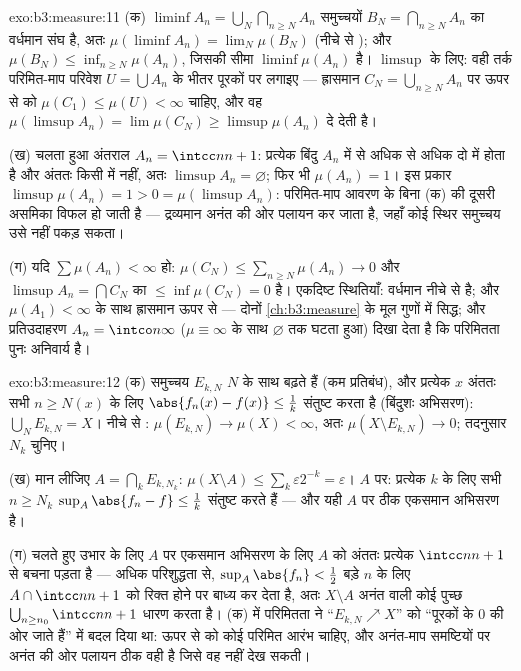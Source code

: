 \begin{solution}{exo:b3:measure:11}
(क) $\liminf A_n = \bigcup_N\bigcap_{n\geq N}A_n$ समुच्चयों $B_N = \bigcap_{n\geq N}A_n$ का वर्धमान संघ है, अतः $\mu(\liminf A_n) = \lim_N\mu(B_N)$ (नीचे से
); और $\mu(B_N) \leq \inf_{n \geq N}\mu(A_n)$, जिसकी सीमा $\liminf\mu(A_n)$ है। $\limsup$ के लिए: वही तर्क
परिमित-माप परिवेश $U = \bigcup A_n$ के भीतर पूरकों पर लगाइए --- ह्रासमान $C_N = \bigcup_{n\geq N}A_n$
पर ऊपर से  को $\mu(C_1)
\leq \mu(U) < \infty$ चाहिए, और वह $\mu(\limsup A_n) =
\lim\mu(C_N) \geq \limsup\mu(A_n)$ दे देती है।

(ख) चलता हुआ अंतराल $A_n = \intcc n{n+1}$: प्रत्येक बिंदु $A_n$ में से अधिक से अधिक
दो में होता है और अंततः किसी में नहीं, अतः $\limsup A_n = \varnothing$; फिर भी $\mu(A_n) = 1$।
इस प्रकार $\limsup\mu(A_n) = 1 > 0 = \mu(\limsup A_n)$: परिमित-माप आवरण के बिना (क) की दूसरी असमिका विफल
हो जाती है --- द्रव्यमान अनंत की ओर पलायन कर जाता है, जहाँ कोई स्थिर
समुच्चय उसे नहीं पकड़ सकता।

(ग) यदि $\sum\mu(A_n) < \infty$ हो: $\mu(C_N) \leq
\sum_{n\geq N}\mu(A_n) \to 0$ और $\limsup A_n =
\bigcap C_N$ का  $\leq \inf\mu(C_N) = 0$ है। एकदिष्ट स्थितियाँ:
वर्धमान नीचे से  है; और $\mu(A_1) < \infty$ के साथ ह्रासमान ऊपर से 
--- दोनों \cref{ch:b3:measure} के मूल गुणों में सिद्ध; और प्रतिउदाहरण $A_n = \intco n\infty$ ($\mu \equiv \infty$
के साथ $\varnothing$ तक घटता हुआ) दिखा देता है कि परिमितता पुनः अनिवार्य
है।
\end{solution}

\begin{solution}{exo:b3:measure:12}
(क) समुच्चय $E_{k,N}$ $N$ के साथ बढ़ते हैं (कम प्रतिबंध), और प्रत्येक
$x$ अंततः सभी $n \geq N(x)$ के लिए $\abs{f_n(x)
- f(x)} \leq \frac1k$ संतुष्ट करता है (बिंदुशः अभिसरण):
$\bigcup_NE_{k,N} = X$। नीचे से : $\mu(E_{k,N}) \to \mu(X) < \infty$, अतः $\mu(X\setminus
E_{k,N}) \to 0$; तदनुसार $N_k$ चुनिए।

(ख) मान लीजिए $A = \bigcap_kE_{k,N_k}$: $\mu(X\setminus A) \leq
\sum_k\varepsilon2^{-k} = \varepsilon$। $A$ पर: प्रत्येक $k$ के लिए सभी
$n \geq N_k$ $\sup_A\abs{f_n - f} \leq
\frac1k$ संतुष्ट करते हैं --- और यही $A$ पर ठीक एकसमान अभिसरण
है।

(ग) चलते हुए उभार के लिए $A$ पर एकसमान अभिसरण के लिए $A$ को
अंततः प्रत्येक $\intcc n{n+1}$ से बचना पड़ता है --- अधिक परिशुद्धता से, $\sup_A\abs{f_n} < \frac12$
बड़े $n$ के लिए $A \cap \intcc
n{n+1}$ को रिक्त होने पर बाध्य कर देता है, अतः $X \setminus A$
अनंत  वाली कोई पुच्छ $\bigcup_{n\geq n_0}\intcc n{n+1}$ धारण करता है। (क) में परिमितता ने
``$E_{k,N}\nearrow X$'' को ``पूरकों के  $0$ की ओर जाते हैं'' में बदल दिया
था: ऊपर से  को कोई परिमित आरंभ चाहिए, और अनंत-माप समष्टियों
पर अनंत की ओर पलायन ठीक वही है जिसे वह नहीं देख सकती।
\end{solution}

